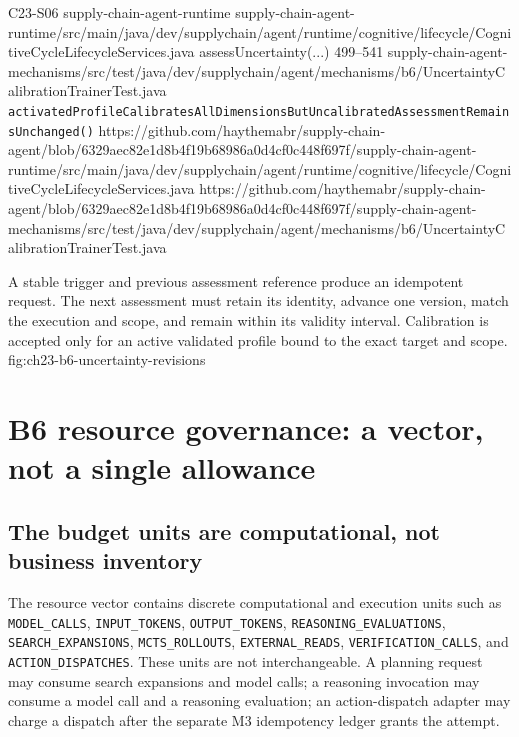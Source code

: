 \BookSourceReferenceQR
  {C23-S06}
  {supply-chain-agent-runtime}
  {supply-chain-agent-runtime/src/main/java/dev/supplychain/agent/runtime/cognitive/lifecycle/CognitiveCycleLifecycleServices.java}
  {assessUncertainty(...)}
  {499--541}
  {supply-chain-agent-mechanisms/src/test/java/dev/supplychain/agent/mechanisms/b6/UncertaintyCalibrationTrainerTest.java}
  {\texttt{activatedProfileCalibratesAllDimensionsBut\allowbreak UncalibratedAssessmentRemainsUnchanged()}}
  {https://github.com/haythemabr/supply-chain-agent/blob/6329aec82e1d8b4f19b68986a0d4cf0c448f697f/supply-chain-agent-runtime/src/main/java/dev/supplychain/agent/runtime/cognitive/lifecycle/CognitiveCycleLifecycleServices.java}
  {https://github.com/haythemabr/supply-chain-agent/blob/6329aec82e1d8b4f19b68986a0d4cf0c448f697f/supply-chain-agent-mechanisms/src/test/java/dev/supplychain/agent/mechanisms/b6/UncertaintyCalibrationTrainerTest.java}

  {A stable trigger and previous assessment reference produce an idempotent request. The next assessment must retain its identity, advance one version, match the execution and scope, and remain within its validity interval. Calibration is accepted only for an active validated profile bound to the exact target and scope.}
  {fig:ch23-b6-uncertainty-revisions}

\section{B6 resource governance: a vector, not a single allowance}
\label{sec:ch23-b6-resource-governance}

\subsection{The budget units are computational, not business inventory}
\label{subsec:ch23-resource-vector}

The resource vector contains discrete computational and execution units such as \texttt{MODEL\_CALLS}, \texttt{INPUT\_TOKENS}, \texttt{OUTPUT\_TOKENS}, \texttt{REASONING\_EVALUATIONS}, \texttt{SEARCH\_EXPANSIONS}, \texttt{MCTS\_ROLLOUTS}, \texttt{EXTERNAL\_READS}, \texttt{VERIFICATION\_CALLS}, and \texttt{ACTION\_\allowbreak DISPATCHES}. These units are not interchangeable. A planning request may consume search expansions and model calls; a reasoning invocation may consume a model call and a reasoning evaluation; an action-dispatch adapter may charge a dispatch after the separate M3 idempotency ledger grants the attempt.

